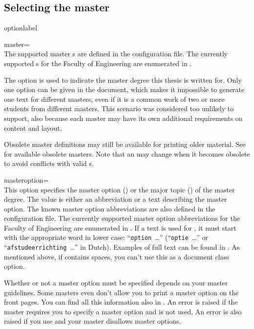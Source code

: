 \subsection{Selecting the master}
\begin{labelled}{optionlabel}
\item[master=\meta{id\,}]\\
  The supported master s are defined in the configuration file.
  The currently supported s for the Faculty of Engineering are
  enumerated in .

  The  option is used to indicate the master degree this
  thesis is written for. Only one  option can be given in
  the document, which makes it impossible to generate one text for
  different masters, even if it is a common work of two or more students
  from different masters. This scenario was considered too unlikely to
  support, also because each master may have its own additional
  requirements on content and layout.

  Obsolete master definitions may still be available for printing older
  material. See  for available obsolete masters.
  Note that an  may change when it becomes obsolete to avoid
  conflicts with valid s.

\item[masteroption=\meta{mo}]\\
  This option specifies the master option () or the major
  topic () of the master degree. The value
   is either an abbreviation or a text describing the master
  option. The known master option abbreviations are also defined in the
  configuration file. The currently supported master option abbreviations
  for the Faculty of Engineering are enumerated in . If
  a text is used for , it must start with the appropriate word in
  lower case: ``\texttt{option }\ldots''
  (``\texttt{\foreignlanguage{dutch}{optie} }\ldots'' or
  ``\texttt{\foreignlanguage{dutch}{afstudeerrichting} }\ldots'' in Dutch).
  Examples of full text can be found in . As mentioned
  above, if  contains spaces, you can't use this as a document
  class option.

  Whether or not a master option must be specified depends on your master
  guidelines. Some masters even don't allow you to print a master option on
  the front pages. You can find all this information also in
  .
  An error is raised if the master requires you to specify a master option
  and  is not used. An error is also raised if you use
   and your master disallows master options.


\end{labelled}
